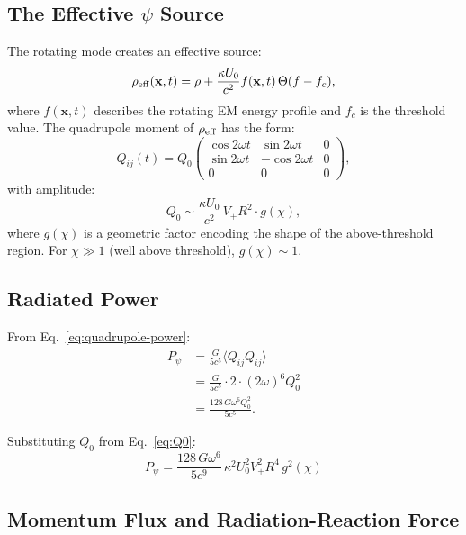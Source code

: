 \documentclass[11pt]{article}
\begin{document}
\subsection{The Effective $\psi$ Source}

The rotating mode creates an effective source:
\begin{equation}
\rho_{\rm eff}(\mathbf{x},t) = \rho
+ \frac{\kappa U_0}{c^2}f(\mathbf{x},t)\,\Theta(f - f_c),
\end{equation}
where $f(\mathbf{x},t)$ describes the rotating EM energy profile and
$f_c$ is the threshold value. The quadrupole moment of $\rho_{\rm eff}$
has the form:
\begin{equation}
Q_{ij}(t) = Q_0\begin{pmatrix}
\cos 2\omega t & \sin 2\omega t & 0 \\
\sin 2\omega t & -\cos 2\omega t & 0 \\
0 & 0 & 0
\end{pmatrix},
\end{equation}
with amplitude:
\begin{equation}\label{eq:Q0}
Q_0 \sim \frac{\kappa U_0}{c^2}\,V_+ R^2 \cdot g(\chi),
\end{equation}
where $g(\chi)$ is a geometric factor encoding the shape of the
above-threshold region. For $\chi \gg 1$ (well above threshold),
$g(\chi) \sim 1$.

\subsection{Radiated Power}

From Eq.~\eqref{eq:quadrupole-power}:
\begin{align}
P_\psi &= \frac{G}{5c^5}\langle\dddot{Q}_{ij}\dddot{Q}_{ij}\rangle
\nonumber\\
&= \frac{G}{5c^5}\cdot 2\cdot(2\omega)^6 Q_0^2 \nonumber\\
&= \frac{128\,G\omega^6 Q_0^2}{5c^5}.
\label{eq:Ppsi}
\end{align}

Substituting $Q_0$ from Eq.~\eqref{eq:Q0}:
\begin{equation}\label{eq:Ppsi-expanded}
\boxed{
P_\psi = \frac{128\,G\omega^6}{5c^9}\,\kappa^2 U_0^2
V_+^2 R^4\,g^2(\chi)
}
\end{equation}

\subsection{Momentum Flux and Radiation-Reaction Force}
\end{document}
